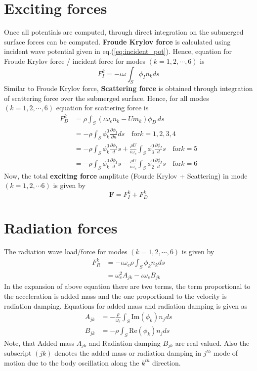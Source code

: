 \section{Exciting forces}
Once all potentials are computed, through direct integration on the submerged surface forces 
can be computed.
{\bf Froude Krylov force} is calculated using incident wave potential given in eq.(\ref{eq:incident_pot}). Hence, 
equation for Froude Krylov force / incident force for modes $(k=1, 2, \cdots, 6)$ is 
\begin{equation}
    F_I^k = -\iota \omega\int_{S} \phi_I n_k ds
\end{equation}
Similar to Froude Krylov force, {\bf Scattering force} is obtained through integration of scattering force over the 
submerged surface. Hence, for all modes $(k=1, 2, \cdots, 6)$ equation for scattering force is 
\begin{align}
    F_D^k &= \rho \int_{S}(\iota \omega_e n_k - Um_k)\phi_D\,ds \\ \nonumber
    &= -\rho \int_{S}\phi_k^0\frac{\partial \phi_I}{\partial n} ds \quad \text{for} k=1, 2, 3, 4 \\ \nonumber 
    &= -\rho \int_{S}\phi_k^0\frac{\partial \phi_I} ds + \frac{\rho U}{i\omega_e}\int_{S}\phi^0_3 
    \frac{\partial \phi_I} ds \quad \text{for} k=5 \\ \nonumber
    &= -\rho \int_{S}\phi_k^0\frac{\partial \phi_I} ds - \frac{\rho U}{i\omega_e}\int_{S}\phi^0_2
    \frac{\partial \phi_I} ds \quad \text{for} k=6
\end{align}
Now, the total {\bf exciting force} amplitute (Fourde Krylov + Scattering) in mode $(k=1, 2, \cdots 6)$ is given by 
\begin{equation}
    \boldsymbol{F} = F^k_I + F^k_D 
\end{equation}
\section{Radiation forces}
The radiation wave load/force for modes $(k=1, 2, \cdots, 6)$ is given by 
\begin{align}
    F_R^k &= -\iota \omega_e \rho \int_{S}\phi_k n_k ds \\ \nonumber
          &= \omega_e^2 A_{jk} - \iota \omega_e B_{jk}
\end{align}
In the expansion of above equation there are two terms, the term proportional to the acceleration is 
added mass and the one proportional to the velocity is radiation damping. Equations for added mass and
radiation damping is given as 
\begin{align}
    A_{jk} &= -\frac{\rho}{\omega_e}\int_{S}\text{Im}(\phi_k) n_j ds \\ 
    B_{jk} &= -\rho \int_{S} \text{Re}(\phi_k)n_j ds 
\end{align}
Note, that Added mass $A_{jk}$ and Radiation damping $B_{jk}$ are real valued. Also the subscript $(jk)$ denotes
the added mass or radiation damping in $j^{th}$ mode of motion due to the body oscillation along the 
$k^{th}$ direction.
